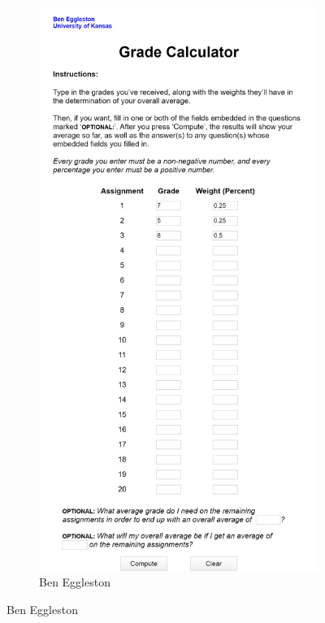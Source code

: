 \begin{figure}[ht!]
    \centering
\begin{subfigure}{0.3\textwidth}
  \includegraphics[frame,width=\linewidth]{media/grade-calculator-ben.png}
    \caption[Ben Eggleston]{Ben Eggleston \cite{grade-calculator-ben}}

\end{subfigure}
\end{figure}
